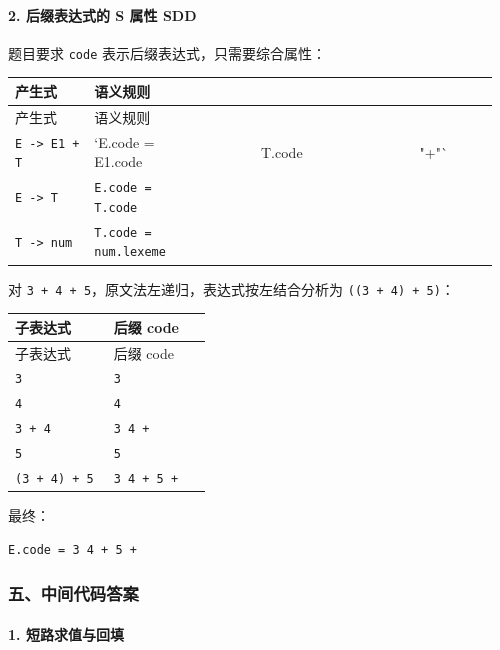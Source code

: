 \documentclass[UTF8]{ctexart}
\begin{document}
\paragraph*{2. 后缀表达式的 S 属性 SDD}

题目要求 \texttt{code} 表示后缀表达式，只需要综合属性：

\begin{longtable}{|p{0.16\linewidth}|p{0.16\linewidth}|p{0.16\linewidth}|p{0.16\linewidth}|p{0.16\linewidth}|p{0.16\linewidth}|}
\hline
产生式 & 语义规则 &  &  &  &  \\
\hline
\endfirsthead
产生式 & 语义规则 &  &  &  &  \\
\hline
\endhead
\texttt{E -> E1 + T} & `E.code = E1.code &  & T.code &  & "+"` \\
\hline
\texttt{E -> T} & \texttt{E.code = T.code} &  &  &  &  \\
\hline
\texttt{T -> num} & \texttt{T.code = num.lexeme} &  &  &  &  \\
\hline
\end{longtable}

对 \texttt{3 + 4 + 5}，原文法左递归，表达式按左结合分析为 \texttt{((3 + 4) + 5)}：

\begin{longtable}{|p{0.47\linewidth}|p{0.47\linewidth}|}
\hline
子表达式 & 后缀 code \\
\hline
\endfirsthead
子表达式 & 后缀 code \\
\hline
\endhead
\texttt{3} & \texttt{3} \\
\hline
\texttt{4} & \texttt{4} \\
\hline
\texttt{3 + 4} & \texttt{3 4 +} \\
\hline
\texttt{5} & \texttt{5} \\
\hline
\texttt{(3 + 4) + 5} & \texttt{3 4 + 5 +} \\
\hline
\end{longtable}

最终：

\begin{Verbatim}[fontsize=\small,breaklines=true]
E.code = 3 4 + 5 +
\end{Verbatim}

\subsubsection*{五、中间代码答案}

\paragraph*{1. 短路求值与回填}
\end{document}
